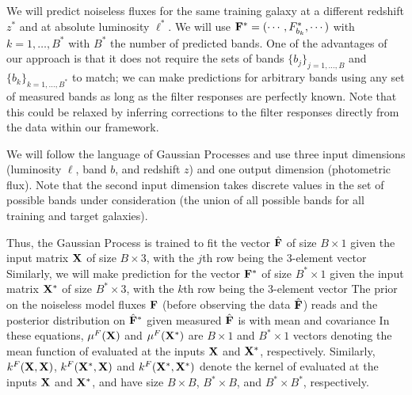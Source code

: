 \documentclass[aps,prd,showpacs,superscriptaddress,groupedaddress]{revtex4}  %
\begin{document}
We will predict noiseless fluxes for the same training galaxy at a different redshift $z^*$ and at absolute luminosity $\ell^*$. 
We will use ${\mat{F}}^* = (\cdots, {F}^*_{b_k}, \cdots)$ with $k=1, \dots, B^*$ with $B^*$ the number of predicted bands. 
One of the advantages of our approach is that it does not require the sets of bands $\{ b_j \}_{j=1, \dots, B}$ and $\{ b_k \}_{k=1, \dots, B^*}$ to match; we can make predictions for arbitrary bands using any set of measured bands as long as the filter responses are perfectly known. Note that this could be relaxed by inferring corrections to the filter responses directly from the data within our framework.

We will follow the language of Gaussian Processes and use three input dimensions (luminosity $\ell$, band $b$, and redshift $z$) and one output dimension (photometric flux). Note that the second input dimension takes discrete values in the set of possible bands under consideration (the union of all possible bands for all training and target galaxies).

Thus, the Gaussian Process is trained to fit the vector $\hat{\mat{F}}$ of size $B \times 1$ given the input matrix $\mat{X}$ of size $B \times 3$, with the $j$th row being the 3-element vector
Similarly, we will make prediction for the vector ${\mat{F}}^*$ of size $B^*\times 1$ given the input matrix $\mat{X^*}$ of size $B^* \times 3$, with the $k$th row being the 3-element vector
The prior on the noiseless model fluxes $\mat{F}$ (before observing the data $\hat{\mat{F}}$) reads
and the posterior distribution on $\hat{\mat{F}}^*$ given measured $\hat{\mat{F}}$  is
with mean and covariance
In these equations, $\mu^F(\mat{X})$ and $\mu^F(\mat{X}^*)$ are $B \times 1$ and  $B^* \times 1$ vectors denoting the mean function of  evaluated at the inputs $\mat{X}$ and $\mat{X}^*$, respectively. 
Similarly, $k^F(\mat{X}, \mat{X})$, $k^F(\mat{X}^*, \mat{X})$ and $k^F(\mat{X}^*, \mat{X}^*)$ denote the kernel of  evaluated at the inputs $\mat{X}$ and $\mat{X}^*$, and have size $B \times B$, $B^* \times B$, and $B^* \times B^*$, respectively.


\end{document}
